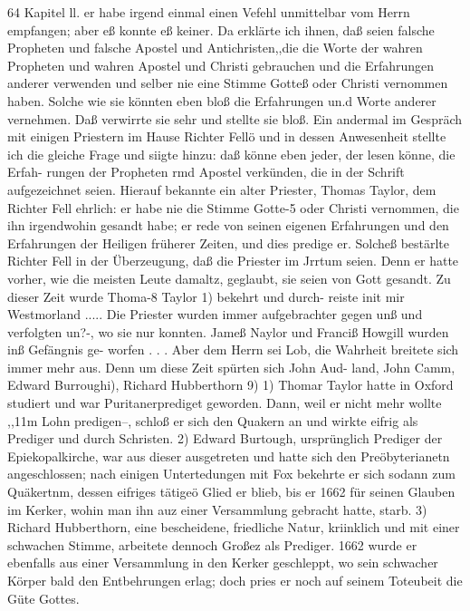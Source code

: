 64 Kapitel ll.
er habe irgend einmal einen Vefehl unmittelbar vom Herrn
empfangen; aber eß konnte eß keiner. Da erklärte ich ihnen, daß
seien falsche Propheten und falsche Apostel und Antichristen,,die
die Worte der wahren Propheten und wahren Apostel und Christi
gebrauchen und die Erfahrungen anderer verwenden und selber
nie eine Stimme Gotteß oder Christi vernommen haben. Solche
wie sie könnten eben bloß die Erfahrungen un.d Worte anderer
vernehmen. Daß verwirrte sie sehr und stellte sie bloß. Ein
andermal im Gespräch mit einigen Priestern im Hause Richter
Fellö und in dessen Anwesenheit stellte ich die gleiche Frage und
siigte hinzu: daß könne eben jeder, der lesen könne, die Erfah-
rungen der Propheten rmd Apostel verkünden, die in der Schrift
aufgezeichnet seien. Hierauf bekannte ein alter Priester, Thomas
Taylor, dem Richter Fell ehrlich: er habe nie die Stimme Gotte-5
oder Christi vernommen, die ihn irgendwohin gesandt habe; er
rede von seinen eigenen Erfahrungen und den Erfahrungen der
Heiligen früherer Zeiten, und dies predige er. Solcheß bestärlte
Richter Fell in der Überzeugung, daß die Priester im Jrrtum
seien. Denn er hatte vorher, wie die meisten Leute damaltz,
geglaubt, sie seien von Gott gesandt.
Zu dieser Zeit wurde Thoma-8 Taylor 1) bekehrt und durch-
reiste init mir Westmorland ..... Die Priester wurden immer
aufgebrachter gegen unß und verfolgten un?-, wo sie nur konnten.
Jameß Naylor und Franciß Howgill wurden inß Gefängnis ge-
worfen . . . Aber dem Herrn sei Lob, die Wahrheit breitete sich
immer mehr aus. Denn um diese Zeit spürten sich John Aud-
land, John Camm, Edward Burroughi), Richard Hubberthorn 9)
1) Thomar Taylor hatte in Oxford studiert und war Puritanerprediget
geworden. Dann, weil er nicht mehr wollte ,,11m Lohn predigen--, schloß er
sich den Quakern an und wirkte eifrig als Prediger und durch Schristen.
2) Edward Burtough, ursprünglich Prediger der Epiekopalkirche, war
aus dieser ausgetreten und hatte sich den Preöbyterianetn angeschlossen; nach
einigen Untertedungen mit Fox bekehrte er sich sodann zum Quäkertnm, dessen
eifriges tätigeö Glied er blieb, bis er 1662 für seinen Glauben im Kerker, wohin
man ihn auz einer Versammlung gebracht hatte, starb.
3) Richard Hubberthorn, eine bescheidene, friedliche Natur, kriinklich und
mit einer schwachen Stimme, arbeitete dennoch Großez als Prediger. 1662 wurde
er ebenfalls aus einer Versammlung in den Kerker geschleppt, wo sein schwacher
Körper bald den Entbehrungen erlag; doch pries er noch auf seinem Toteubeit
die Güte Gottes.


